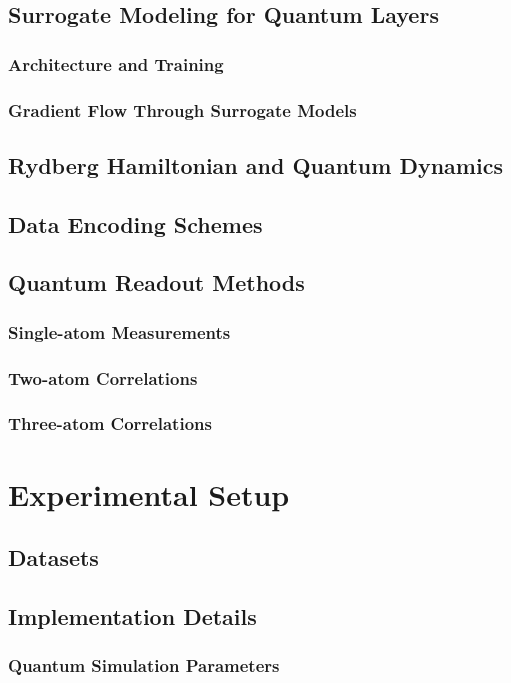 \documentclass[conference]{IEEEtran}
\begin{document}
\subsection{Surrogate Modeling for Quantum Layers}
\subsubsection{Architecture and Training}
\subsubsection{Gradient Flow Through Surrogate Models}
\subsection{Rydberg Hamiltonian and Quantum Dynamics}
\subsection{Data Encoding Schemes}
\subsection{Quantum Readout Methods}
\subsubsection{Single-atom Measurements}
\subsubsection{Two-atom Correlations}
\subsubsection{Three-atom Correlations}

\section{Experimental Setup}
\subsection{Datasets}
\subsection{Implementation Details}
\subsubsection{Quantum Simulation Parameters}
\end{document}
